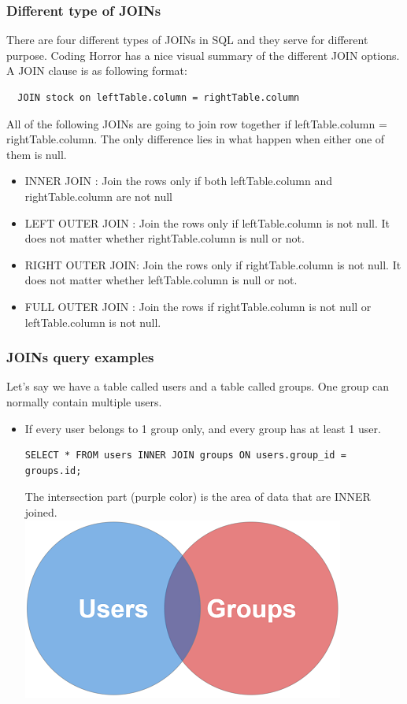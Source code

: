 \documentclass[a4paper]{article}
\begin{document}
\subsubsection{Different type of JOINs}
There are four different types of JOINs in SQL and they serve for different purpose. Coding Horror has a nice visual summary of the different JOIN options.\\

A JOIN clause is as following format:
\begin{lstlisting}
  JOIN stock on leftTable.column = rightTable.column
\end{lstlisting}
All of the following JOINs are going to join row together if leftTable.column = rightTable.column. The only difference lies in what happen when either one of them is null.
\begin{itemize}
\item INNER JOIN : Join the rows only if both leftTable.column and rightTable.column are not null
\item LEFT OUTER JOIN : Join the rows only if leftTable.column is not null. It does not matter whether rightTable.column is null or not.
\item RIGHT OUTER JOIN: Join the rows only if rightTable.column is not null. It does not matter whether leftTable.column is null or not.
\item FULL OUTER JOIN : Join the rows if rightTable.column is not null or leftTable.column is not null.
\end{itemize}

\subsubsection{JOINs query examples}
Let’s say we have a table called users and a table called groups. One group can normally contain multiple users.
\begin{itemize}
\item If every user belongs to 1 group only, and every group has at least 1 user.
\begin{lstlisting}
SELECT * FROM users INNER JOIN groups ON users.group_id = groups.id;
\end{lstlisting}
The intersection part (purple color) is the area of data that are INNER joined.\\
\includegraphics{img/inner_join.png}
\end{itemize}
\end{document}
